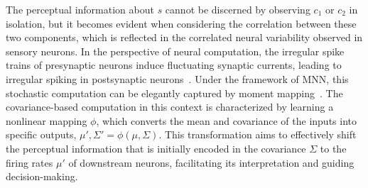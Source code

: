 The perceptual information about \(s\) cannot be discerned by observing \(c_1\) or \(c_2\) in isolation, but it becomes evident when considering the correlation between these two components, which is reflected in the correlated neural variability observed in sensory neurons. 
In the perspective of neural computation, the irregular spike trains of presynaptic neurons induce fluctuating synaptic currents, leading to irregular spiking in postsynaptic neurons~\cite{de2007correlation}. 
Under the framework of MNN, this stochastic computation can be elegantly captured by moment mapping~\cite{Qi2023}.
The covariance-based computation in this context is characterized by learning a nonlinear mapping \(\phi\), which converts the mean and covariance of the inputs into specific outputs, \(\mu', \Sigma' = \phi(\mu, \Sigma)\). 
This transformation aims to effectively shift the perceptual information that is initially encoded in the covariance \(\Sigma\) to the firing rates \(\mu'\) of downstream neurons, facilitating its interpretation and guiding decision-making.
